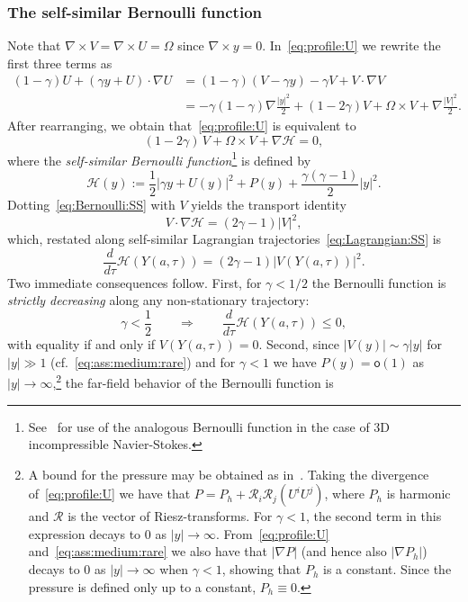 \documentclass[11pt,reqno]{amsproc}
\numberwithin{equation}{section}
\theoremstyle{remark}
\begin{document}
{\subsubsection{{The self-similar Bernoulli function}}
Note that $\nabla \times V = \nabla \times U = \Omega$ since $\nabla \times y = 0$.
In~\eqref{eq:profile:U} we rewrite the first three terms as 
\begin{align*}
(1-\gamma) U +  (\gamma y + U) \cdot \nabla U 
&= (1-\gamma) (V - \gamma y) - \gamma V  + V \cdot \nabla V \\
&=- \gamma (1-\gamma) \nabla \frac{|y|^2}{2} 
+ (1- 2\gamma) V  
+ \Omega \times V 
+ \nabla \frac{|V|^2}{2}
.
\end{align*}
After rearranging, we obtain that~\eqref{eq:profile:U} is equivalent to
\begin{equation}
\label{eq:Bernoulli:SS}
(1-2\gamma)\, V + \Omega \times V + \nabla \mathcal{H} = 0,
\end{equation}
where the \emph{self-similar Bernoulli function}\footnote{See~\cite{NRS96} for use of the analogous Bernoulli function in the case of  3D incompressible Navier-Stokes.} is defined by
\begin{equation}
\label{eq:Bernoulli:def}
\mathcal{H}(y) := \frac{1}{2} |\gamma y + U(y)|^2 + P(y) + \frac{\gamma(\gamma-1)}{2} |y|^2 .
\end{equation}
Dotting~\eqref{eq:Bernoulli:SS} with $V$ yields the transport identity 
\begin{equation}
\label{eq:Bernoulli:transport}
V \cdot \nabla \mathcal{H} = (2\gamma - 1)|V|^2,
\end{equation}
which, restated along self-similar Lagrangian trajectories~\eqref{eq:Lagrangian:SS} is 
\begin{equation}
\label{eq:Bernoulli:transport:2}
\frac{d}{d\tau} \mathcal{H}(Y(a,\tau)) = (2\gamma-1) |V(Y(a,\tau))|^2
.
\end{equation}
Two immediate consequences follow. First, for $\gamma < 1/2$ the Bernoulli function is \emph{strictly decreasing} along any non-stationary trajectory:
\begin{equation}
\label{eq:Bernoulli:Lyapunov}
\gamma < \frac 12 
\qquad \Longrightarrow \qquad
\frac{d}{d\tau} \mathcal{H}(Y(a,\tau)) \leq 0,
\end{equation}
with equality if and only if $V(Y(a,\tau)) = 0$.
Second, since $|V(y)| \sim \gamma |y|$ for $|y| \gg 1$ (cf.~\eqref{eq:ass:medium:rare}) and for $\gamma <1$ we have $P(y) = \mathsf{o}(1)$ as $|y|\to \infty$,\footnote{A bound for the  pressure may be obtained as in~\cite{NRS96}. Taking the divergence of~\eqref{eq:profile:U} we have that $P = P_h + \mathcal{R}_i \mathcal{R}_j(U^i U^j)$, where $P_h$ is harmonic and $\mathcal{R}$ is the vector of Riesz-transforms. For $\gamma<1$, the second term in this expression decays to $0$ as $|y|\to \infty$. From~\eqref{eq:profile:U} and~\eqref{eq:ass:medium:rare} we also have that $|\nabla P|$ (and hence also $|\nabla P_h|$) decays to $0$ as $|y| \to \infty$ when $\gamma<1$, showing that $P_h$ is a constant. Since the pressure is defined only up to a constant, $P_h \equiv 0$. } the far-field behavior of the Bernoulli function is
}
\end{document}

